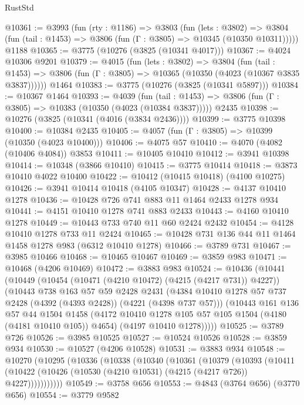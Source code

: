 \begin{lexlean}{RustStd}
\begin{coremodule}
@10361 := @3993
    (fun (rty : @1186) =>
    @3803
      (fun (lets : @3802) =>
      @3804 (fun (tail : @1453) => @3806 (fun (Γ : @3805) => @10345 (@10350 @10311)))))
    @1188
@10365 := @3775 (@10276 (@3825 (@10341 @4017)))
@10367 := @4024 @10306 @9201
@10379 := @4015
    (fun (lets : @3802) =>
    @3804
      (fun (tail : @1453) =>
      @3806 (fun (Γ : @3805) => @10365 (@10350 (@4023 (@10367 @3835 @3837))))))
    @1464
@10383 := @3775 (@10276 (@3825 (@10341 @5897)))
@10384 := @10367 @1464
@10393 := @4039
    (fun (tail : @1453) => @3806 (fun (Γ : @3805) => @10383 (@10350 (@4023 (@10384 @3837)))))
    @2435
@10398 := @10276 (@3825 (@10341 (@4016 (@3834 @2436))))
@10399 := @3775 @10398
@10400 := @10384 @2435
@10405 := @4057 (fun (Γ : @3805) => @10399 (@10350 (@4023 @10400)))
@10406 := @4075 @57
@10410 := @4070 (@4082 (@10406 @4084)) @3853
@10411 := @10405 @10410
@10412 := @3941 @10398
@10414 := @10348 (@3866 @10410)
@10415 := @3775 @10414
@10418 := @3873 @10410 @4022 @10400
@10422 := @10412 (@10415 @10418) (@4100 @10275)
@10426 := @3941 @10414 @10418 (@4105 @10347)
@10428 := @4137 @10410 @1278
@10436 := @10428 @726 @741 @883 @11 @1464 @2433 @1278 @934
@10441 := @4151 @10410 @1278 @741 @883 @2433
@10443 := @4160 @10410 @1278
@10449 := @10443 @733 @740 @11 @60 @2424 @2432
@10454 := @4128 @10410 @1278 @733 @11 @2424
@10465 := @10428 @731 @136 @44 @11 @1464 @1458 @1278 @983 (@6312 @10410 @1278)
@10466 := @3789 @731
@10467 := @3985 @10466
@10468 := @10465 @10467
@10469 := @3859 @983
@10471 := @10468 (@4206 @10469)
@10472 := @3883 @983
@10524 := @10436
    (@10441
      (@10449
        (@10454 (@10471 (@4210 @10472) (@4215 (@4217 @731)) @4227))
        (@10443
          @738
          @163
          @57
          @59
          @2428
          @2431
          (@4384 @10410 @1278 @57 @737 @2428 (@4392 (@4393 @2428)) (@4221 (@4398 @737 @57)))
          (@10443
            @161
            @136
            @57
            @44
            @1504
            @1458
            (@4172 @10410 @1278 @105 @57 @105 @1504 (@4180 (@4181 @10410 @105)) @4654)
            (@4197 @10410 @1278)))))
@10525 := @3789 @726
@10526 := @3985 @10525
@10527 := @10524 @10526
@10528 := @3859 @934
@10530 := @10527 (@4206 @10528)
@10531 := @3883 @934
@10548 := @10270
    (@10295
      (@10336
        (@10338
          (@10340
            (@10361
              (@10379
                (@10393
                  (@10411
                    (@10422 (@10426 (@10530 (@4210 @10531) (@4215 (@4217 @726)) @4227)))))))))))
@10549 := @3758 @656
@10553 := @4843 (@3764 @656) (@3770 @656)
@10554 := @3779 @9582

\end{coremodule}
\end{lexlean}
